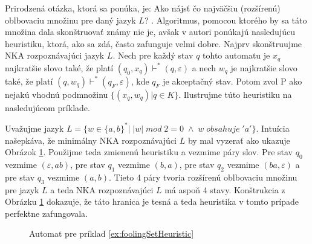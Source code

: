 Prirodzená otázka, ktorá sa ponúka, je: \glqq Ako nájsť čo najväčšiu (rozšírenú) oblbovaciu množinu pre daný jazyk $ L $? \grqq. Algoritmus, pomocou ktorého by sa táto množina dala skonštruovať známy nie je, avšak v 
\cite{GlaisterShalit1996} autori ponúkajú nasledujúcu heuristiku, ktorá, ako sa zdá, často zafunguje velmi dobre. Najprv skonštruujme NKA rozpoznávajúci jazyk $ L $. Nech pre každý stav $ q $ tohto automatu je $ x_q $ najkratšie slovo také, že platí $ (q_0,x_q) \vdash^{*} (q,\varepsilon) $ a nech $ w_q $ je najkratšie slovo také, že platí $ (q, w_q) \vdash^{*} (q_F,\varepsilon) $, kde $ q_F $ je akceptačný stav. Potom zvol P ako nejakú vhodnú podmnožinu $ \lbrace (x_q,w_q) | q \in K \rbrace $. Ilustrujme túto heuristiku na nasledujúcom príklade.

\begin{example}
\label{ex:foolingSetHeuristic}
Uvažujme jazyk $ L = \lbrace w \in \lbrace a,b \rbrace^{*} | \; |w| \; mod \; 2 = 0 \; \wedge \; w \; obsahuje \; 'a' \rbrace $. Intuícia našepkáva, že minimálny NKA rozpoznávajúci $ L $ by mal vyzerať ako ukazuje Obrázok \ref{fig:FoolingSetHeuristicNFA}. Použijme teda zmienenú heuristiku a vezmime páry slov. Pre stav $ q_0 $ vezmime $ (\varepsilon,ab) $, pre stav $ q_1 $ vezmime $ (b,a) $, pre stav $ q_2 $ vezmime $ (ba,\varepsilon) $ a pre stav $ q_3 $ vezmime $ (a,b) $. Tieto 4 páry tvoria rozšírenú oblbovaciu množinu pre jazyk $ L $ a teda NKA rozpoznávajúci $ L $ má aspoň 4 stavy. Konštrukcia z Obrázku \ref{fig:FoolingSetHeuristicNFA} dokazuje, že táto hranica je tesná a teda heuristika v tomto prípade perfektne zafungovala.

\begin{figure}
\centering
{}
\caption{Automat pre príklad \ref{ex:foolingSetHeuristic}}
\label{fig:FoolingSetHeuristicNFA}
\end{figure}
\end{example}

